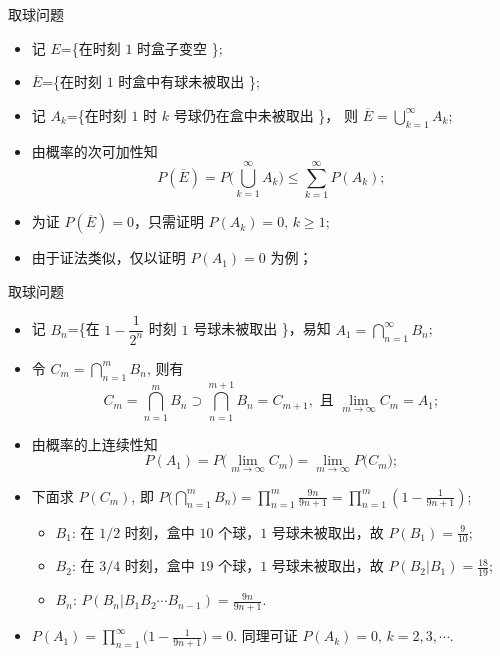 \begin{frame}{取球问题}
	\jieda\
	\begin{itemize}[<+-|alert@+>]
		\item 记 $E$=\{在时刻 $1$ 时盒子变空 \};
		\item $\overline{E}$=\{在时刻 $1$ 时盒中有球未被取出 \};
		\item 记 $A_k$=\{在时刻 $1$ 时 $k$ 号球仍在盒中未被取出 \}， 则 \pause$\overline{E}=\bigcup\limits_{k=1}^{\infty} A_k$;\pause
		\item 由概率的次可加性知
		$$ P( \overline{E})= P\big(\bigcup_{k=1}^{\infty}A_k\big)\leq\sum_{k=1}^{\infty} P(A_k);$$
		\item 为证 $ P (\overline{E})=0$，只需证明 $P (A_k)=0,\,k\geq 1$;
		\item 由于证法类似，仅以证明 $ P (A_1)=0$ 为例；
	\end{itemize} %


\end{frame}

\begin{frame}{取球问题}
	\begin{itemize}[<+-|alert@+>]
	\item 记 $B_n$=\{在 $1-\dfrac{1}{2^n}$ 时刻 $1$ 号球未被取出 \}，\pause 易知 $A_1=\bigcap\limits_{n=1}^{\infty} B_n$;\pause
	\item 令 $C_m=\bigcap\limits_{n=1}^{m} B_n$, 则有 \pause
	\[C_m=\bigcap\limits_{n=1}^{m} B_n\supset\bigcap\limits_{n=1}^{m+1} B_n=C_{m+1},\mbox{ 且 } \lim_{m\rightarrow\infty} C_m=A_1;\]\pause
	\item 由概率的上连续性知 $$ P (A_1)= P\big (\lim_{m\rightarrow\infty} C_m\big)=\lim_{m\rightarrow\infty} P\big (C_m\big);$$
	\item 下面求 $P (C_m)$, 即 $P\big (\bigcap_{n=1}^{m} B_n\big)=\prod_{n=1}^{m}\frac{9n}{9n+1}=\prod_{n=1}^{m}\left (1-\frac{1}{9n+1}\right)$;
	\begin{itemize}[<+-|alert@+>]
		\item $B_1$: 在 $1/2$ 时刻，盒中 $10$ 个球，$1$ 号球未被取出，故 \pause $ P (B_1)=\frac{9}{10}$;\pause
		\item $B_2$: 在 $3/4$ 时刻，盒中 $19$ 个球，$1$ 号球未被取出，故 \pause $ P (B_2|B_1)=\frac{18}{19}$;\pause
		\item $B_n$: $ P(B_n|B_1B_2\cdots B_{n-1})=\frac{9n}{9n+1}.$
	\end{itemize}
\item $ P (A_1)=\prod_{n=1}^{\infty}\big (1-\frac{1}{9n+1}\big)=0.$ 同理可证 $ P (A_k)=0,\,k=2,3,\cdots$.
\end{itemize} %



\end{frame}

